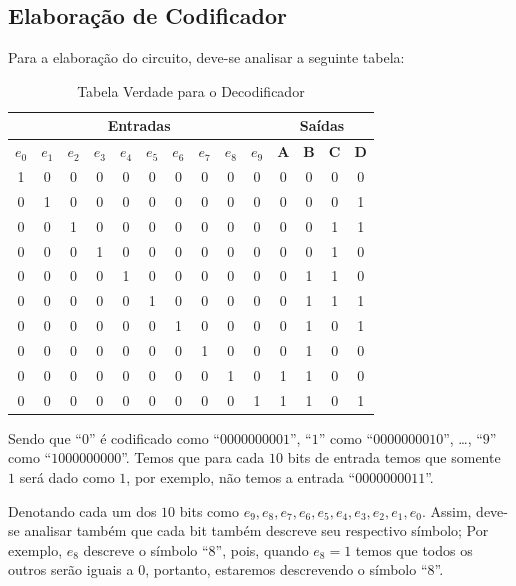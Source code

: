 \documentclass[12pt]{article}
\begin{document}
\subsection{Elaboração de Codificador}\label{sec:2.1}

Para a elaboração do circuito, deve-se analisar a seguinte tabela:
\begin{table}[H]
    \centering
    \caption{Tabela Verdade para o Decodificador}
    \begin{tabular}{|c|c|c|c|c|c|c|c|c|c||c|c|c|c|}\hline
    \multicolumn{10}{|c||}{Entradas} & \multicolumn{4}{|c|}{Saídas} \\\hline
    \textbf{$e_{0}$} & \textbf{$e_{1}$} & \textbf{$e_{2}$} & \textbf{$e_{3}$} & \textbf{$e_{4}$} & \textbf{$e_{5}$} & \textbf{$e_{6}$} & \textbf{$e_{7}$} & \textbf{$e_{8}$} & \textbf{$e_{9}$} & \textbf{A} & \textbf{B} & \textbf{C} & \textbf{D} \\\hline
    1 & 0 & 0 & 0 & 0 & 0 & 0 & 0 & 0 & 0 & 0 & 0 & 0 & 0\\\hline
    0 & 1 & 0 & 0 & 0 & 0 & 0 & 0 & 0 & 0 & 0 & 0 & 0 & 1\\\hline
    0 & 0 & 1 & 0 & 0 & 0 & 0 & 0 & 0 & 0 & 0 & 0 & 1 & 1 \\\hline
    0 & 0 & 0 & 1 & 0 & 0 & 0 & 0 & 0 & 0 & 0 & 0 & 1 & 0\\\hline
    0 & 0 & 0 & 0 & 1 & 0 & 0 & 0 & 0 & 0 & 0 & 1 & 1 & 0\\\hline
    0 & 0 & 0 & 0 & 0 & 1 & 0 & 0 & 0 & 0 & 0 & 1 & 1 & 1\\\hline
    0 & 0 & 0 & 0 & 0 & 0 & 1 & 0 & 0 & 0 & 0 & 1 & 0 & 1\\\hline
    0 & 0 & 0 & 0 & 0 & 0 & 0 & 1 & 0 & 0 & 0 & 1 & 0 & 0\\\hline
    0 & 0 & 0 & 0 & 0 & 0 & 0 & 0 & 1 & 0 & 1 & 1 & 0 & 0\\\hline
    0 & 0 & 0 & 0 & 0 & 0 & 0 & 0 & 0 & 1 & 1 & 1 & 0 & 1\\\hline
    \end{tabular}\label{tab:tabela_and}
\end{table}

Sendo que ``$0$'' é codificado como ``$0000000001$'', ``$1$'' como
``$0000000010$'', \ldots, ``$9$'' como ``$1000000000$''. Temos que para cada
$10$ bits de entrada temos que somente $1$ será dado como $1$, por exemplo, não
temos a entrada ``$0000000011$''.

Denotando cada um dos $10$ bits como
$e_{9},e_{8},e_{7},e_{6},e_{5},e_{4},e_{3},e_{2},e_{1},e_{0}$. Assim, deve-se
analisar também que cada bit também descreve seu respectivo símbolo; Por
exemplo, $e_{8}$ descreve o símbolo ``$8$'', pois, quando $e_{8}=1$ temos que
todos os outros serão iguais a $0$, portanto, estaremos descrevendo o símbolo
``$8$''.
\end{document}
